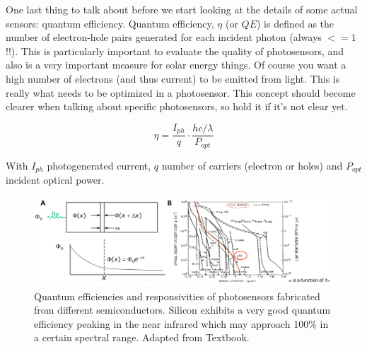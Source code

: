 One last thing to talk about before we start looking at the details of some actual sensors: quantum efficiency. Quantum efficiency, $\eta$ (or $QE$) is defined as the number of electron-hole pairs generated for each incident photon (always $<=1$ !!). This is particularly important to evaluate the quality of photosensors, and also is a very important measure for solar energy things. Of course you want a high number of electrons (and thus current) to be emitted from light. This is really what needs to be optimized in a photosensor. This concept should become clearer when talking about specific photosensors, so hold it if it's not clear yet. 

\begin{equation}
    \eta = \frac{I_{ph}}{q}\cdot \frac{hc/\lambda}{P_{opt}}
\end{equation}

With $I_{ph}$ photogenerated current, $q$ number of carriers (electron or holes) and $P_{opt}$ incident optical power.

\begin{figure}[H]
    \centering
    \includegraphics[width=1\linewidth]{../../Figures/Optical_Absorbtion.PNG}
    \caption{Quantum efficiencies and responsivities of photosensors fabricated from different semiconductors. Silicon exhibits a very good quantum efficiency peaking in the near infrared which may approach 100\% in a certain spectral range. Adapted from Textbook.}
    \label{fig:Optical_Absorbtion}
\end{figure}




